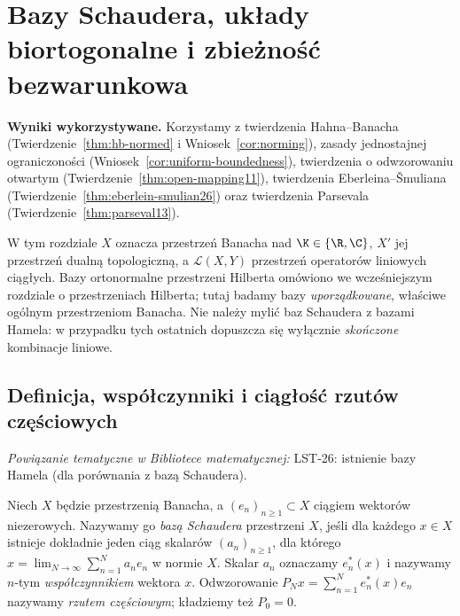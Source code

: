 \setcounter{section}{26}
\section{Bazy Schaudera, układy biortogonalne i zbieżność bezwarunkowa}
\label{sec:bazy27}

\providecommand{\atlasref}[2]{#2}

\noindent\textbf{Wyniki wykorzystywane.}
Korzystamy z twierdzenia Hahna--Banacha (Twierdzenie~\ref{thm:hb-normed}
i Wniosek~\ref{cor:norming}), zasady jednostajnej ograniczoności
(Wniosek~\ref{cor:uniform-boundedness}), twierdzenia o odwzorowaniu
otwartym (Twierdzenie~\ref{thm:open-mapping11}), twierdzenia
Eberleina--\v Smuliana (Twierdzenie~\ref{thm:eberlein-smulian26})
oraz twierdzenia Parsevala (Twierdzenie~\ref{thm:parseval13}).
\par\medskip

W tym rozdziale $X$ oznacza przestrzeń Banacha nad $\K\in\{\R,\C\}$,
$X'$ jej przestrzeń dualną topologiczną, a $\mathcal L(X,Y)$
przestrzeń operatorów liniowych ciągłych. Bazy ortonormalne przestrzeni
Hilberta omówiono we wcześniejszym rozdziale o przestrzeniach Hilberta; tutaj badamy bazy
\emph{uporządkowane}, właściwe ogólnym przestrzeniom Banacha.
Nie należy mylić baz Schaudera z bazami Hamela: w przypadku tych
ostatnich dopuszcza się wyłącznie \emph{skończone} kombinacje liniowe.

\subsection{Definicja, współczynniki i ciągłość rzutów częściowych}

\noindent\emph{Powiązanie tematyczne w Bibliotece matematycznej:} \atlasref{LST-26::thm:choice-hamel-basis}{LST-26: istnienie bazy Hamela (dla porównania z bazą Schaudera)}.


\begin{definicja}
\label{def:schauder27}
Niech $X$ będzie przestrzenią Banacha, a $(e_n)_{n\ge1}\subset X$
ciągiem wektorów niezerowych. Nazywamy go \emph{bazą Schaudera}
przestrzeni $X$, jeśli dla każdego $x\in X$ istnieje dokładnie jeden
ciąg skalarów $(a_n)_{n\ge1}$, dla którego
$x=\lim_{N\to\infty}\sum_{n=1}^N a_ne_n$ w normie $X$.
Skalar $a_n$ oznaczamy $e_n^*(x)$ i nazywamy $n$-tym
\emph{współczynnikiem} wektora $x$. Odwzorowanie
$P_Nx=\sum_{n=1}^Ne_n^*(x)e_n$ nazywamy
\emph{rzutem częściowym}; kładziemy też $P_0=0$.
\end{definicja}

